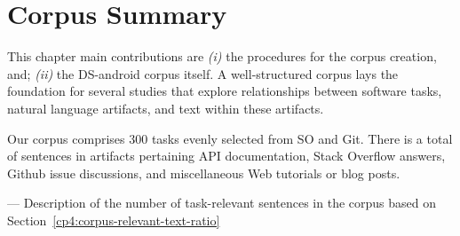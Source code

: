 
\section{Corpus Summary}
\label{cp4:corpus-summary}

This chapter main contributions are \textit{(i)} the procedures for the corpus creation, and; \textit{(ii)} the \acs{DS-android} corpus itself. A well-structured corpus lays the foundation for several studies that explore relationships between software tasks, natural language artifacts, and text within these artifacts. 

Our corpus comprises 300 tasks evenly selected from SO and Git. 
There is a total of  sentences in  artifacts pertaining API documentation, Stack Overflow answers, Github issue discussions, and miscellaneous Web tutorials or blog posts. 

--- Description of the number of task-relevant sentences in the corpus based on Section~\ref{cp4:corpus-relevant-text-ratio}















